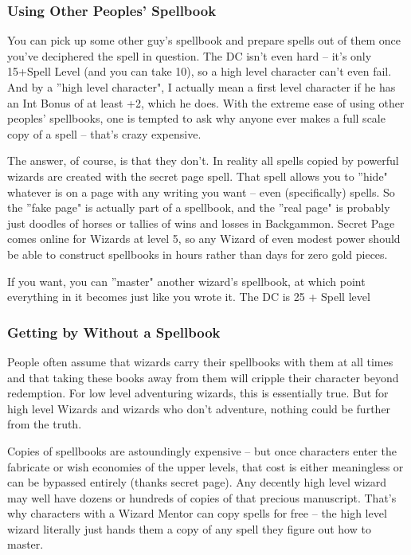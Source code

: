 \subsubsection{Using Other Peoples' Spellbook}

You can pick up some other guy's spellbook and prepare spells out of them once you've deciphered the spell in question. The DC isn't even hard -- it's only 15+Spell Level (and you can take 10), so a high level character can't even fail. And by a ''high level character", I actually mean a first level character if he has an Int Bonus of at least +2, which he does. With the extreme ease of using other peoples' spellbooks, one is tempted to ask why anyone ever makes a full scale copy of a spell -- that's crazy expensive.

The answer, of course, is that they don't. In reality all spells copied by powerful wizards are created with the secret page spell. That spell allows you to ''hide" whatever is on a page with any writing you want -- even (specifically) spells. So the ''fake page" is actually part of a spellbook, and the ''real page" is probably just doodles of horses or tallies of wins and losses in Backgammon. Secret Page comes online for Wizards at level 5, so any Wizard of even modest power should be able to construct spellbooks in hours rather than days for zero gold pieces.

If you want, you can ''master" another wizard's spellbook, at which point everything in it becomes just like you wrote it. The DC is 25 + Spell level

\subsubsection{Getting by Without a Spellbook}

People often assume that wizards carry their spellbooks with them at all times and that taking these books away from them will cripple their character beyond redemption. For low level adventuring wizards, this is essentially true. But for high level Wizards and wizards who don't adventure, nothing could be further from the truth.

Copies of spellbooks are astoundingly expensive -- but once characters enter the fabricate or wish economies of the upper levels, that cost is either meaningless or can be bypassed entirely (thanks secret page). Any decently high level wizard may well have dozens or hundreds of copies of that precious manuscript. That's why characters with a Wizard Mentor can copy spells for free -- the high level wizard literally just hands them a copy of any spell they figure out how to master.


